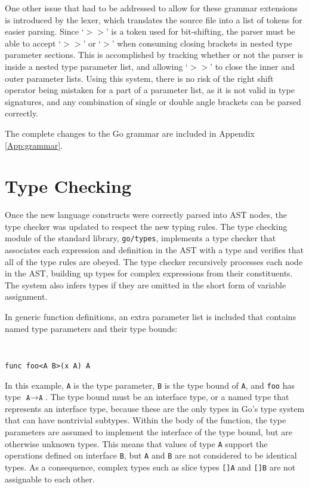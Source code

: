 \documentclass[letterpaper,twocolumn,11pt]{article}
\begin{document}
One other issue that had to be addressed to allow for these grammar extensions is introduced by the lexer, which translates the source file into a list of tokens for easier parsing. Since `\textbf{$>>$}' is a token used for bit-shifting, the parser must be able to accept `\textbf{$>>$}' or  `\textbf{$>$}' when consuming closing brackets in nested type parameter sections. This is accomplished by tracking whether or not the parser is inside a nested type parameter list, and allowing  `\textbf{$>>$}' to close the inner and outer parameter lists. Using this system, there is no risk of the right shift operator being mistaken for a part of a parameter list, as it is not valid in type signatures, and any combination of single or double angle brackets can be parsed correctly.

The complete changes to the Go grammar are included in Appendix \ref{App:grammar}.

\section{Type Checking} \label{type_checking}

Once the new language constructs were correctly parsed into AST nodes, the type checker was updated to respect the new typing rules. The type checking module of the standard library, \texttt{go/types}, implements a type checker that associates each expression and definition in the AST with a type and verifies that all of the type rules are obeyed. The type checker recursively processes each node in the AST, building up types for complex expressions from their constituents. The system also infers types if they are omitted in the short form of variable assignment. 

In generic function definitions, an extra parameter list is included that contains named type parameters and their type bounds:

{ \tt \small
\begin{verbatim}
func foo<A B>(x A) A
\end{verbatim}
}

In this example, \texttt{A} is the type parameter, \texttt{B} is the type bound of \texttt{A}, and \texttt{foo} has type $\texttt{A} \rightarrow \texttt{A}$. The type bound must be an interface type, or a named type that represents an interface type, because these are the only types in Go's type system that can have nontrivial subtypes. Within the body of the function, the type parameters are assumed to implement the interface of the type bound, but are otherwise unknown types. This means that values of type \texttt{A} support the operations defined on interface \texttt{B}, but \texttt{A} and \texttt{B} are not considered to be identical types. As a consequence, complex types such as slice types \texttt{[]A} and \texttt{[]B} are not assignable to each other.
\end{document}
